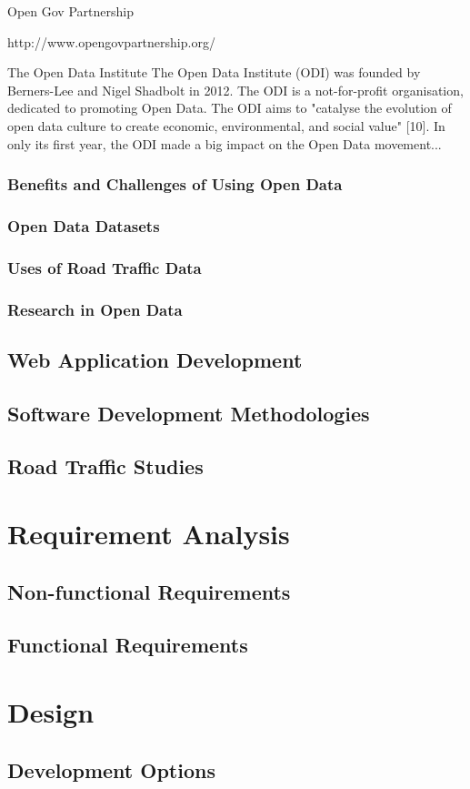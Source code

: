 \documentclass[authoryearcitations]{UoYCSproject}
\begin{document}
Open Gov Partnership

http://www.opengovpartnership.org/

The Open Data Institute
The Open Data Institute (ODI) was founded by Berners-Lee and Nigel Shadbolt in 2012. The ODI is a not-for-profit organisation, dedicated to promoting Open Data. The ODI aims to "catalyse the evolution of open data culture to create economic, environmental, and social value" [10]. In only its first year, the ODI made a big impact on the Open Data movement...

\subsection{Benefits and Challenges of Using Open Data}

\subsection{Open Data Datasets}

\subsection{Uses of Road Traffic Data}

\subsection{Research in Open Data}

\section{Web Application Development}

\section{Software Development Methodologies}

\section{Road Traffic Studies}

\chapter{Requirement Analysis}

\section{Non-functional Requirements}

\section{Functional Requirements}

\chapter{Design}

\section{Development Options}





\end{document}
